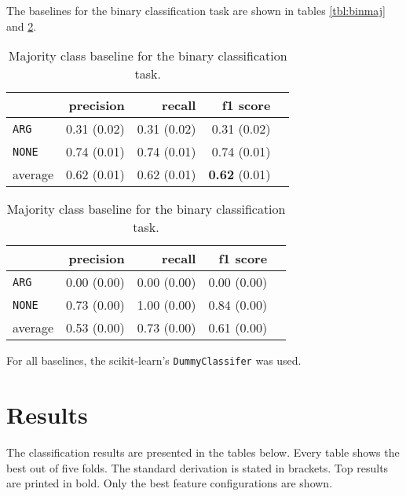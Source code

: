 The baselines for the binary classification task are shown in tables \ref{tbl:binmaj} and \ref{tbl:binstrat}.


\begin{table}[!htb]
    \begin{minipage}{.5\linewidth}
      \caption{Random (stratified) baseline for the binary classification task.}
      \label{tbl:binmaj}
      \centering
      
\begin{tabular}{@{}lrrrr@{}}
\toprule
 	&	 precision &	 recall &	 f1 score  \\ \midrule 
\texttt{ARG}	&	 0.31 \scriptsize{(0.02)} &	 0.31 \scriptsize{(0.02)} &	 0.31 \scriptsize{(0.02)}  \\ 
\texttt{NONE}	&	 0.74 \scriptsize{(0.01)} &	 0.74 \scriptsize{(0.01)} &	 0.74 \scriptsize{(0.01)}  \\ 
average	&	 0.62 \scriptsize{(0.01)} &	 0.62 \scriptsize{(0.01)} &	 \textbf{0.62} \scriptsize{(0.01)}  \\ 
\bottomrule
\end{tabular}

  \end{minipage}%
    \begin{minipage}{.5\linewidth}
      \centering
        \caption{Majority class baseline for the binary classification task.}
        \label{tbl:binstrat}
\begin{tabular}{@{}lrrrr@{}}
\toprule
 	&	 precision &	 recall &	 f1 score  \\ \midrule 
\texttt{ARG}	&	 0.00 \scriptsize{(0.00)} &	 0.00 \scriptsize{(0.00)} &	 0.00 \scriptsize{(0.00)}  \\ 
\texttt{NONE}	&	 0.73 \scriptsize{(0.00)} &	 1.00 \scriptsize{(0.00)} &	 0.84 \scriptsize{(0.00)}  \\ 
average	&	 0.53 \scriptsize{(0.00)} &	 0.73 \scriptsize{(0.00)} &	 0.61 \scriptsize{(0.00)}  \\ 
\bottomrule
\end{tabular}
    \end{minipage} 
\end{table}


For all baselines, the scikit-learn's \texttt{DummyClassifer} was used.



\section{Results}
\label{sec:3_results}
The classification results are presented in the tables below. Every table shows the best out of five folds. The standard derivation is stated in brackets. Top results are printed in bold. Only the best feature configurations are shown.

